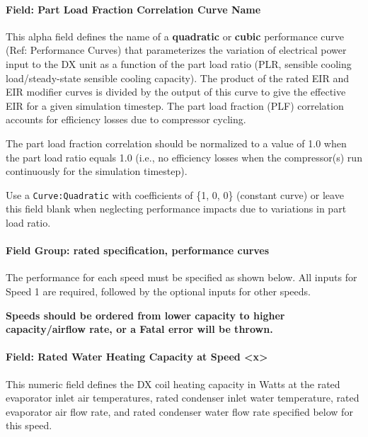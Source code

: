 \paragraph{Field: Part Load Fraction Correlation Curve Name}\label{vshpwhheating-part-load-fraction-correlation-curve-name}

This alpha field defines the name of a \textbf{quadratic} or \textbf{cubic} performance curve (Ref: Performance Curves) that parameterizes the variation of electrical power input to the DX unit as a function of the part load ratio (PLR, sensible cooling load/steady-state sensible cooling capacity).
The product of the rated EIR and EIR modifier curves is divided by the output of this curve to give the effective EIR for a given simulation timestep.
The part load fraction (PLF) correlation accounts for efficiency losses due to compressor cycling.

The part load fraction correlation should be normalized to a value of 1.0 when the part load ratio equals 1.0 (i.e., no efficiency losses when the compressor(s) run continuously for the simulation timestep).

Use a \lstinline!Curve:Quadratic! with coefficients of \{1, 0, 0\} (constant curve) or leave this field blank when neglecting performance impacts due to variations in part load ratio.

\paragraph{Field Group: rated specification, performance curves}\label{field-group-rated-specification-performance-curves-and-waste-heat-data-x}

The performance for each speed must be specified as shown below.
All inputs for Speed 1 are required, followed by the optional inputs for other speeds.

\textbf{Speeds should be ordered from lower capacity to higher capacity/airflow rate, or a Fatal error will be thrown.}


\paragraph{Field: Rated Water Heating Capacity at Speed \textless{}x\textgreater{}}\label{vshpwhheating-rated-water-heating-capacity-at-speed-x}

This numeric field defines the DX coil heating capacity in Watts at the rated evaporator inlet air temperatures, rated condenser inlet water temperature, rated evaporator air flow rate, and rated condenser water flow rate specified below for this speed.

